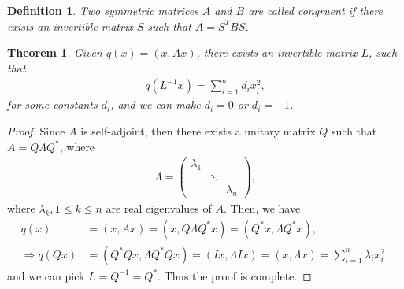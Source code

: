 \documentclass[11pt]{book}
\newtheorem{definition}{Definition}[chapter]
\newtheorem{theorem}{Theorem}[chapter]
\theoremstyle{definition}
\numberwithin{equation}{chapter}
\begin{document}
\medskip

\begin{definition}
Two symmetric matrices $A$ and $B$ are called congruent if there exists an invertible matrix $S$ such that $A = S^T B S$.
\end{definition}

\medskip

\begin{theorem}
Given $q(x) = (x, Ax)$, there exists an invertible matrix $L$, such that
\begin{align*}
    q\left(L^{-1}x\right) = \sum^n_{i=1} d_i x_i^2,
\end{align*}
for some constants $d_i$, and we can make $d_i = 0$ or $d_i = \pm 1$.
\end{theorem}
\begin{proof}
Since $A$ is self-adjoint, then there exists a unitary matrix $Q$ such that $A = Q\Lambda Q^*$, where 
\begin{align*}
    \Lambda = \begin{pmatrix}
    \lambda_1 &  &  \\
     & \ddots  &  \\
     &   & \lambda_n
    \end{pmatrix},
\end{align*}
where $\lambda_k, 1\leq k \leq n$ are real eigenvalues of $A$. Then, we have
\begin{align*}
    q(x) & = (x, Ax) = (x, Q\Lambda Q^* x) = (Q^* x, \Lambda Q^* x), \\
    \Rightarrow q(Qx) & = (Q^* Q x, \Lambda Q^* Q x) = (Ix, \Lambda I x) = (x, \Lambda x) = \sum^n_{i=1} \lambda_i x_i^2,
\end{align*}
and we can pick $L = Q^{-1} = Q^*$. Thus the proof is complete.
\end{proof}

\medskip
\end{document}
